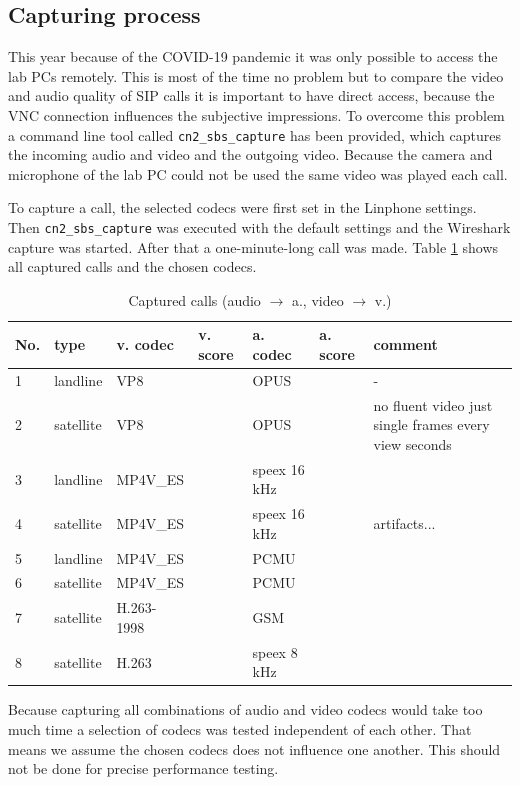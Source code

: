 \documentclass[parskip=full]{scrartcl}
\begin{document}
\subsection{Capturing process} \label{subsec:capture}
This year because of the COVID-19 pandemic it was only possible to access the lab PCs remotely.
This is most of the time no problem but to compare the video and audio quality of SIP calls it is important to have direct access, because the VNC connection influences the subjective impressions.
To overcome this problem a command line tool called \verb|cn2_sbs_capture| has been provided, which captures the incoming audio and video and the outgoing video.
Because the camera and microphone of the lab PC could not be used the same video was played each call.

To capture a call, the selected codecs were first set in the Linphone settings. 
Then \verb|cn2_sbs_capture| was executed with the default settings and the Wireshark capture was started. 
After that a one-minute-long call was made. 
Table \ref{tab:capture} shows all captured calls and the chosen codecs.

\begin{table}[hb]
	\centering
	\begin{tabular}{|l|l|l|l|l|l|p{}|}
		\hline
		\textbf{No.} & \textbf{type} & \textbf{v. codec} &\textbf{v. score} & \textbf{a. codec} & \textbf{a. score} & \textbf{comment} \\ 
		\hline
		1 & landline & VP8 & & OPUS &&- \\
		2 & satellite & VP8 & &  OPUS &&no fluent video just single frames every view seconds\\
		3 & landline & MP4V\_ES && speex 16 kHz &&\\
		4 & satellite & MP4V\_ES && speex 16 kHz && artifacts... \\
		5 & landline & MP4V\_ES && PCMU &&\\
		6 & satellite & MP4V\_ES && PCMU &&\\
		7 & satellite & H.263-1998 && GSM&&\\
		8 & satellite & H.263 && speex 8 kHz&&\\
		\hline
	\end{tabular}
	\caption{Captured calls (audio $\rightarrow$ a., video $\rightarrow$ v.)}
	\label{tab:capture}
\end{table}

Because capturing all combinations of audio and video codecs would take too much time a selection of codecs was tested independent of each other.
That means we assume the chosen codecs does not influence one another.
This should not be done for precise performance testing.
\end{document}

